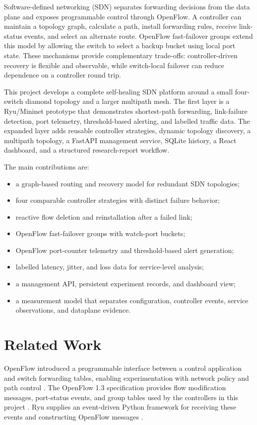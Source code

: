 \documentclass[conference]{IEEEtran}
\begin{document}
Software-defined networking (SDN) separates forwarding decisions from the
data plane and exposes programmable control through OpenFlow. A controller can
maintain a topology graph, calculate a path, install forwarding rules, receive
link-status events, and select an alternate route. OpenFlow fast-failover
groups extend this model by allowing the switch to select a backup bucket
using local port state. These mechanisms provide complementary trade-offs:
controller-driven recovery is flexible and observable, while switch-local
failover can reduce dependence on a controller round trip.

This project develops a complete self-healing SDN platform around a small
four-switch diamond topology and a larger multipath mesh. The first layer is a
Ryu/Mininet prototype that demonstrates shortest-path forwarding, link-failure
detection, port telemetry, threshold-based alerting, and labelled traffic
data. The expanded layer adds reusable controller strategies, dynamic
topology discovery, a multipath topology, a FastAPI management service, SQLite
history, a React dashboard, and a structured research-report workflow.

The main contributions are:
\begin{itemize}
\item a graph-based routing and recovery model for redundant SDN topologies;
\item four comparable controller strategies with distinct failure behavior;
\item reactive flow deletion and reinstallation after a failed link;
\item OpenFlow fast-failover groups with watch-port buckets;
\item OpenFlow port-counter telemetry and threshold-based alert generation;
\item labelled latency, jitter, and loss data for service-level analysis;
\item a management API, persistent experiment records, and dashboard view;
\item a measurement model that separates configuration, controller events,
  service observations, and dataplane evidence.
\end{itemize}

\section{Related Work}
\label{sec:related}

OpenFlow introduced a programmable interface between a control application and
switch forwarding tables, enabling experimentation with network policy and
path control \cite{mckeown2008}. The OpenFlow 1.3 specification provides flow
modification messages, port-status events, and group tables used by the
controllers in this project \cite{openflow13}. Ryu supplies an event-driven
Python framework for receiving these events and constructing OpenFlow
messages \cite{ryu}.
\end{document}
